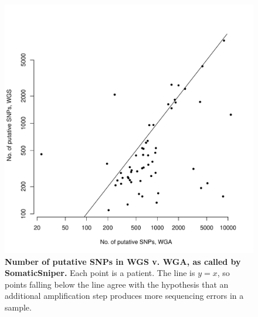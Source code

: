 \documentclass[11pt]{article} %
\begin{document}
\begin{figure}
\centerline{
\includegraphics[width=5in]{C282_v_C484.pdf} }
\caption{\textbf{Number of putative SNPs in WGS v. WGA, as called by SomaticSniper.} Each point is a patient. The line is $y=x$, so points falling below the line agree with the hypothesis that an additional amplification step produces more sequencing errors in a sample.}
\end{figure}
\end{document}
